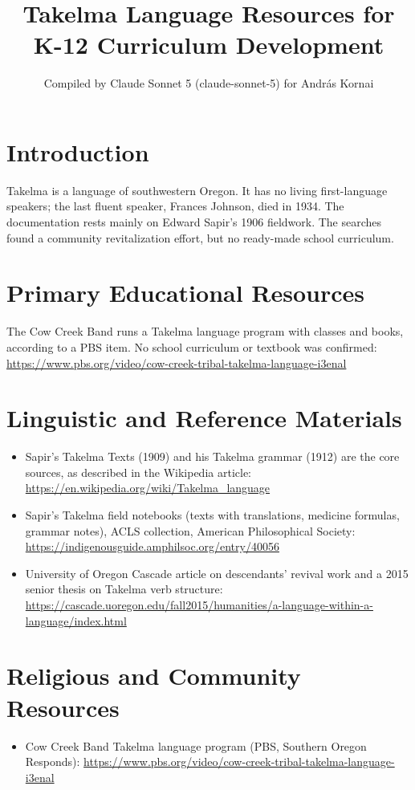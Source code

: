 \documentclass[12pt]{article}
\title{Takelma Language Resources for K-12 Curriculum Development}
\author{Compiled by Claude Sonnet 5 (claude-sonnet-5) for Andr\'as Kornai}
\date{}
\begin{document}
\maketitle

\section{Introduction}
Takelma is a language of southwestern Oregon. It has no living first-language speakers; the last fluent speaker, Frances Johnson, died in 1934. The documentation rests mainly on Edward Sapir's 1906 fieldwork. The searches found a community revitalization effort, but no ready-made school curriculum.

\section{Primary Educational Resources}
The Cow Creek Band runs a Takelma language program with classes and books, according to a PBS item. No school curriculum or textbook was confirmed:
\url{https://www.pbs.org/video/cow-creek-tribal-takelma-language-i3enal}

\section{Linguistic and Reference Materials}
\begin{itemize}
\item Sapir's Takelma Texts (1909) and his Takelma grammar (1912) are the core sources, as described in the Wikipedia article: \url{https://en.wikipedia.org/wiki/Takelma_language}
\item Sapir's Takelma field notebooks (texts with translations, medicine formulas, grammar notes), ACLS collection, American Philosophical Society: \url{https://indigenousguide.amphilsoc.org/entry/40056}
\item University of Oregon Cascade article on descendants' revival work and a 2015 senior thesis on Takelma verb structure: \url{https://cascade.uoregon.edu/fall2015/humanities/a-language-within-a-language/index.html}
\end{itemize}

\section{Religious and Community Resources}
\begin{itemize}
\item Cow Creek Band Takelma language program (PBS, Southern Oregon Responds): \url{https://www.pbs.org/video/cow-creek-tribal-takelma-language-i3enal}
\end{itemize}
\end{document}
